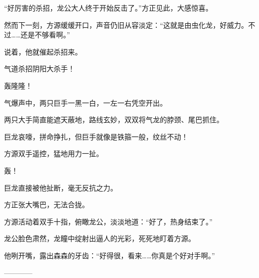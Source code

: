 \begin{this_body}
“好厉害的杀招，龙公大人终于开始反击了。”方正见此，大感惊喜。

然而下一刻，方源缓缓开口，声音仍旧从容淡定：“这就是由虫化龙，好威力。不过……还是不够看啊。”

说着，他就催起杀招来。

气道杀招阴阳大杀手！

轰隆隆！

气爆声中，两只巨手一黑一白，一左一右凭空开出。

两只大手简直能遮天蔽地，路线玄妙，双双将气龙的脖颈、尾巴抓住。

巨龙哀嚎，拼命挣扎，但巨手就像是铁箍一般，纹丝不动！

方源双手遥控，猛地用力一扯。

轰！

巨龙直接被他扯断，毫无反抗之力。

方正张大嘴巴，无法合拢。

方源活动着双手十指，俯瞰龙公，淡淡地道：“好了，热身结束了。”

龙公脸色肃然，龙瞳中绽射出逼人的光彩，死死地盯着方源。

他咧开嘴，露出森森的牙齿：“好得很，看来……你真是个好对手啊。”

------------

\end{this_body}

